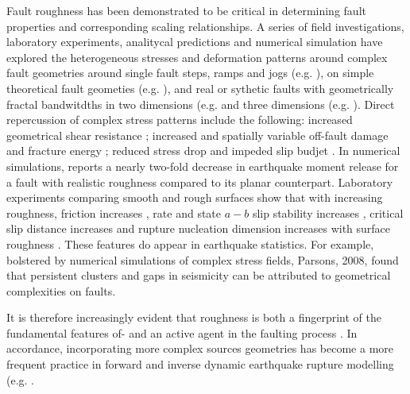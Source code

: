 \documentclass[12pt,a4paper]{article}
\begin{document}
	Fault roughness has been demonstrated to be critical in determining fault properties and corresponding scaling relationships. A series of field investigations, laboratory experiments, analitycal predictions and numerical simulation have explored the heterogeneous stresses and deformation patterns around complex fault geometries around single fault steps, ramps and jogs (e.g. \cite{berger1980first, segall1980mechanics, mcclay1987analogue, kilsdonk1989analytical, burgmann1994slip}), on simple theoretical fault geometies (e.g. \cite{chester1997stress, chester2000stress}), and real or sythetic faults with geometrically fractal bandwitdths in two dimensions (e.g. \cite{saucier1992stress, griffith2010rough, dunham2011earthquake, ritz2015influence} and three dimensions (e.g. \cite{okada1992internal, meade2007algorithms, shi2013rupture, zielke2016sub, zielke2017fault}). Direct repercussion of complex stress patterns include the following: increased geometrical shear resistance \cite{fang2013additional}; increased and spatially variable off-fault damage and fracture energy \cite{okubo1984effects, chester2000stress, griffith2010rough}; reduced stress drop \cite{zielke2016sub} and impeded slip budjet \cite{dieterich2009nonplanar}. In numerical simulations, \citet{zielke2017fault} reports a nearly two-fold decrease in earthquake moment release for a fault with realistic roughness compared to its planar counterpart. Laboratory experiments comparing smooth and rough surfaces show that with increasing roughness, friction increases \cite{biegel19921}, rate and state $a-b$ slip stability increases \cite{marone1994scaling}, critical slip distance increases and rupture nucleation dimension increases with surface roughness \cite{okubo1984nonplanar}. These features do appear in earthquake statistics. For example, bolstered by numerical simulations of complex stress fields, Parsons, 2008, found that persistent clusters and gaps in seismicity can be attributed to geometrical complexities on faults.
 
It is therefore increasingly evident that roughness is both a fingerprint of the fundamental features of- and an active agent in the faulting process \cite{scholz1986fractal, brodsky2016constraints, candela2011stress}. In accordance, incorporating more complex sources geometries has become a more frequent practice in forward and inverse dynamic earthquake rupture modelling (e.g. \cite{shi2013rupture, moreno2009impact, zielke2016sub}.
\end{document}

